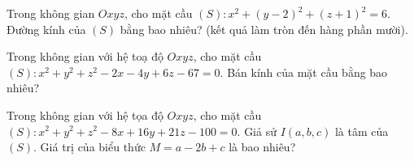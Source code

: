 
\begin{bt}%
	Trong không gian $Oxyz$, cho mặt cầu $(S) \colon x^2+(y-2)^2+(z+1)^2=6$. Đường kính của $(S)$ bằng bao nhiêu? (kết  quả làm tròn đến hàng phần mười).
\end{bt}

\begin{bt}%
	Trong không gian với hệ  toạ độ $Oxyz$, cho mặt cầu $( S)\colon {x^2}+{y^2}+{z^2}-2x-4y+6z-67=0$. Bán kính của mặt cầu bằng bao nhiêu?
\end{bt}

\begin{bt}%
	Trong không gian với hệ  tọa độ $Oxyz$, cho mặt cầu $(S)\colon x^2+y^2+z^2-8x+16y+21z-100=0$. Giả sử $I\left(a,b,c\right)$ là tâm của $(S)$. Giá trị của biểu thức $M=a-2b+c$ là bao nhiêu?
\end{bt}

